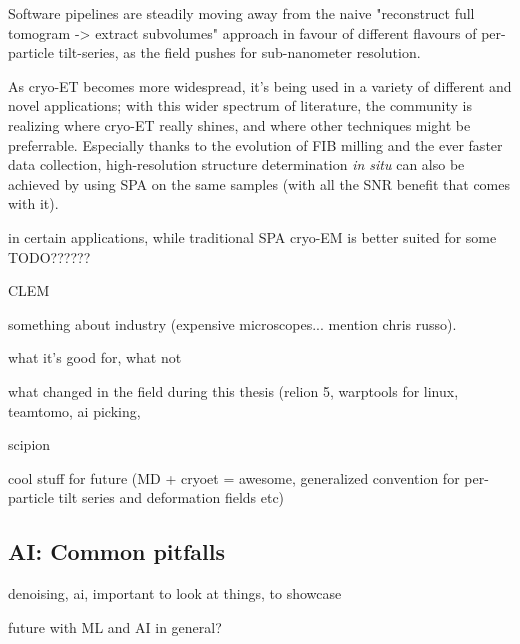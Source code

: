 Software pipelines are steadily moving away from the naive "reconstruct full tomogram -> extract subvolumes" approach in favour of different flavours of per-particle tilt-series, as the field pushes for sub-nanometer resolution.

As cryo-ET becomes more widespread, it's being used in a variety of different and novel applications; with this wider spectrum of literature, the community is realizing where cryo-ET really shines, and where other techniques might be preferrable.
Especially thanks to the evolution of FIB milling and the ever faster data collection, high-resolution structure determination \textit{in situ} can also be achieved by using SPA on the same samples (with all the SNR benefit that comes with it).

in certain applications, while traditional SPA cryo-EM is better suited for some TODO??????

CLEM

something about industry (expensive microscopes... mention chris russo).

what it's good for, what not

what changed in the field during this thesis (relion 5, warptools for linux, teamtomo, ai picking, 

scipion

cool stuff for future (MD + cryoet = awesome, generalized convention for per-particle tilt series and deformation fields etc)

\subsection{AI: Common pitfalls}

denoising, ai, important to look at things, to showcase

future with ML and AI in general?
